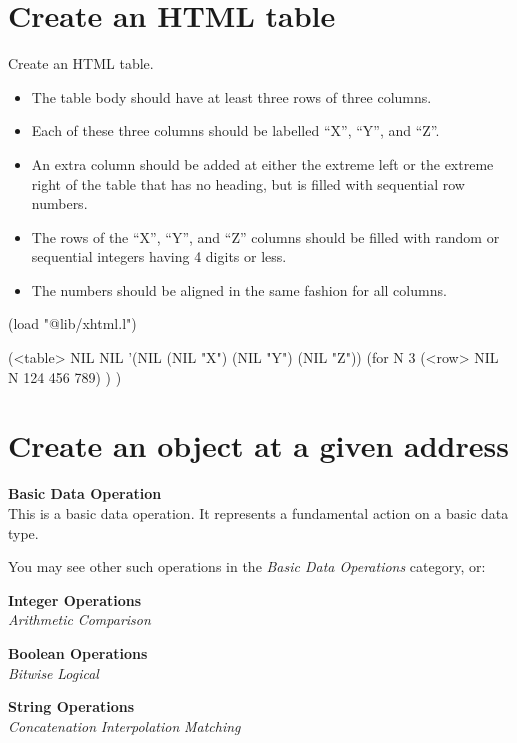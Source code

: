 \pagebreak{}
\section*{Create an HTML table}


Create an HTML table.

\begin{itemize}
\item
  The table body should have at least three rows of three columns.
\item
  Each of these three columns should be labelled ``X'', ``Y'', and
  ``Z''.
\item
  An extra column should be added at either the extreme left or the
  extreme right of the table that has no heading, but is filled with
  sequential row numbers.
\item
  The rows of the ``X'', ``Y'', and ``Z'' columns should be filled with
  random or sequential integers having 4 digits or less.
\item
  The numbers should be aligned in the same fashion for all columns.
\end{itemize}



\begin{wideverbatim}

(load "@lib/xhtml.l")

(<table> NIL NIL '(NIL (NIL "X") (NIL "Y") (NIL "Z"))
   (for N 3
      (<row> NIL N 124 456 789) ) )

\end{wideverbatim}

\pagebreak{}
\section*{Create an object at a given address}


\textbf{Basic Data Operation}\\ This is a basic data operation. It
represents a fundamental action on a basic data type.

You may see other such operations in the \emph{Basic Data Operations}
category, or:

\textbf{Integer Operations} \\
\emph{Arithmetic} \textbar{} \emph{Comparison}

\textbf{Boolean Operations} \\ \emph{Bitwise} \textbar{}
\emph{Logical}

\textbf{String Operations} \\
\emph{Concatenation} \textbar{} \emph{Interpolation} \textbar{}
\emph{Matching}

